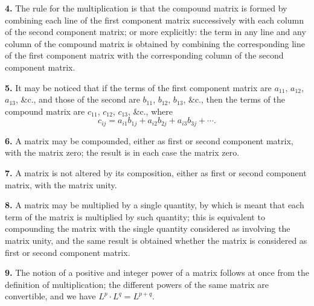 \documentclass[11pt,a4paper]{book}
\begin{document}
\begin{center}
\medskip
\noindent\textbf{4.} The rule for the multiplication is that the compound matrix is formed by combining each line of the first component matrix successively with each column of the second component matrix; or more explicitly: the term in any line and any column of the compound matrix is obtained by combining the corresponding line of the first component matrix with the corresponding column of the second component matrix.

\medskip
\noindent\textbf{5.} It may be noticed that if the terms of the first component matrix are $a_{11}$, $a_{12}$, $a_{13}$, \&c., and those of the second are $b_{11}$, $b_{12}$, $b_{13}$, \&c., then the terms of the compound matrix are $c_{11}$, $c_{12}$, $c_{13}$, \&c., where
\[c_{ij} = a_{i1}b_{1j} + a_{i2}b_{2j} + a_{i3}b_{3j} + \cdots.\]

\medskip
\noindent\textbf{6.} A matrix may be compounded, either as first or second component matrix, with the matrix zero; the result is in each case the matrix zero.

\medskip
\noindent\textbf{7.} A matrix is not altered by its composition, either as first or second component matrix, with the matrix unity.

\medskip
\noindent\textbf{8.} A matrix may be multiplied by a single quantity, by which is meant that each term of the matrix is multiplied by such quantity; this is equivalent to compounding the matrix with the single quantity considered as involving the matrix unity, and the same result is obtained whether the matrix is considered as first or second component matrix.

\medskip
\noindent\textbf{9.} The notion of a positive and integer power of a matrix follows at once from the definition of multiplication; the different powers of the same matrix are convertible, and we have $L^p \cdot L^q = L^{p+q}$.


\end{center}
\end{document}
